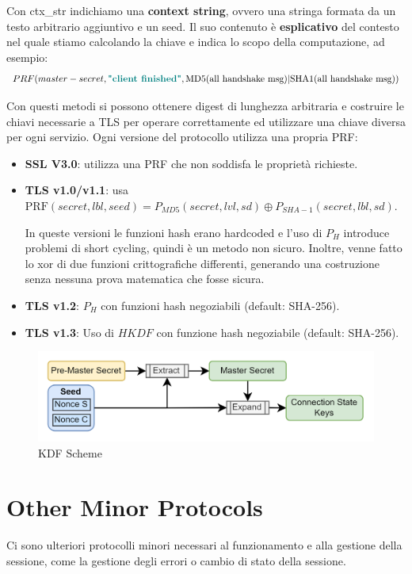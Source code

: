 \begin{note}
Con ctx\_str indichiamo una \textbf{context string}, ovvero una stringa formata da un testo arbitrario aggiuntivo e un seed.
Il suo contenuto è \textbf{esplicativo} del contesto nel quale stiamo calcolando la chiave e indica lo scopo della computazione, ad esempio:
\[PRF(master-secret, \textcolor{teal}{\text{\textbf{"client finished"}}}, \text{MD5}(\text{all handshake msg})|\text{SHA1}(\text{all handshake msg}))\]
\end{note}
Con questi metodi si possono ottenere digest di lunghezza arbitraria e costruire le chiavi necessarie a TLS per operare correttamente ed utilizzare una chiave diversa per ogni servizio. Ogni versione del protocollo utilizza una propria PRF:
\begin{itemize}
    \item \textbf{SSL V3.0}: utilizza una PRF che non soddisfa le proprietà richieste.
    \item \textbf{TLS v1.0/v1.1}: usa $\text{PRF}(secret, lbl,seed)=P_{MD5}(secret,lvl,sd)\oplus P_{SHA-1}(secret,lbl,sd)$.
    \begin{remark}
    In queste versioni le funzioni hash erano hardcoded e l'uso di $P_H$ introduce problemi di short cycling, quindi è un metodo non sicuro. Inoltre, venne fatto lo xor di due funzioni crittografiche differenti, generando una costruzione senza nessuna prova matematica che fosse sicura.
    \end{remark}
    \item \textbf{TLS v1.2}: $P_H$ con funzioni hash negoziabili (default: SHA-256).
    \item \textbf{TLS v1.3}: Uso di $HKDF$ con funzione hash negoziabile (default: SHA-256).
\end{itemize}
\begin{figure}[h]
    \centering
    \includegraphics{image/kdf.png}
    \caption{KDF Scheme}
    \label{fig:kdf}
\end{figure}
\pagebreak
\section{Other Minor Protocols}
Ci sono ulteriori protocolli minori necessari al funzionamento e alla gestione della sessione, come la gestione degli errori o cambio di stato della sessione.
